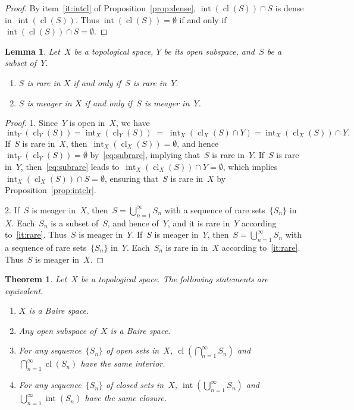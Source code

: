 \documentclass[11pt,a4paper]{article}  %
\newtheorem{theorem}{Theorem}[section]
\newtheorem{lemma}{Lemma}[section]
\theoremstyle{definition}
\DeclareMathOperator{\inter}{int}
\DeclareMathOperator{\cl}{cl}
\numberwithin{equation}{section}
\begin{document}
\begin{proof}
  By item~\ref{it:intcl} of Proposition~\ref{prop:dense}, $\inter(\cl(S)) \cap S$ is dense
  in~$\inter(\cl(S))$. Thus $\inter(\cl(S)) = \emptyset$ if and only if $\inter(\cl(S)) \cap S = \emptyset$.
\end{proof}

\begin{lemma}
  \label{lem:openb}
  Let~$X$ be a topological space, $Y$ be its open subspace, and~$S$ be a subset of~$Y$.
  \begin{enumerate}
    \item \label{it:rare}$S$ is rare in $X$ if and only if~$S$ is rare in~$Y$.
    \item $S$ is meager in $X$ if and only if~$S$ is meager in~$Y$.
  \end{enumerate}
\end{lemma}

\begin{proof}
  1. Since~$Y$ is open in~$X$, we have
 \begin{equation}
   \label{eq:subrare}
     \inter_Y(\cl_Y(S)) = \inter_X(\cl_Y(S)) \;=\; \inter_X(\cl_X(S)\cap Y) = \inter_X(\cl_X(S))\cap Y.
 \end{equation}
   If~$S$ is rare in~$X$, then~$\inter_X(\cl_X(S))=\emptyset$, and hence~$\inter_Y(\cl_Y(S))
   = \emptyset$ by~\eqref{eq:subrare},
   implying that~$S$ is rare in~$Y$.
   If~$S$ is rare in~$Y$, then~\eqref{eq:subrare} leads
   to~$\inter_{X}(\cl_X(S))\cap Y = \emptyset$, which implies~$\inter_X(\cl_X(S))\cap
   S = \emptyset$,  ensuring that~$S$ is rare in~$X$ by Proposition~\ref{prop:intclr}.

   2. If~$S$ is meager in~$X$, then~$S= \bigcup_{n=1}^\infty S_n$ with a sequence of rare
   sets~$\{S_n\}$ in~$X$. Each~$S_n$ is a subset of~$S$, and hence of~$Y$, and it is rare
   in~$Y$ according to~\ref{it:rare}. Thus~$S$ is meager in~$Y$. If~$S$ is meager in~$Y$, then~$S
   = \bigcup_{n=1}^\infty S_n$ with a sequence of rare sets~$\{S_n\}$ in~$Y$. Each~$S_n$ is rare in
   in~$X$ according to~\ref{it:rare}. Thus~$S$ is meager in~$X$.
\end{proof}


\begin{theorem}
  \label{th:intcl}
   Let~$X$ be a topological space. The following statements are equivalent.
   \begin{enumerate}
     \item $X$ is a Baire space.
     \item Any open subspace of~$X$ is a Baire space.
     \item For any sequence~$\{S_n\}$ of open sets in~$X$, $\cl(\bigcap_{n=1}^\infty S_n)$ and
       $\bigcap_{n=1}^\infty \cl(S_n)$ have the same interior.
     \item For any sequence~$\{S_n\}$ of closed sets in~$X$, $\inter(\bigcup_{n=1}^\infty S_n)$ and
       $\bigcup_{n=1}^\infty \inter(S_n)$ have the same closure.
   \end{enumerate}
\end{theorem}
\end{document}
